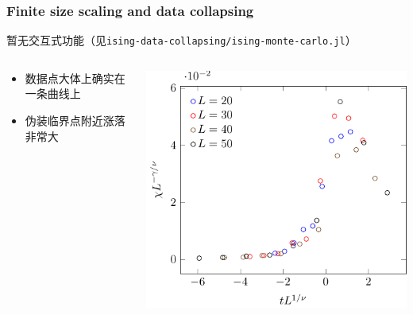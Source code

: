 \documentclass[UTF8]{ctexbeamer}
\begin{document}
\begin{frame}
\frametitle{Finite size scaling and data collapsing}

暂无交互式功能（见\texttt{ising-data-collapsing/ising-monte-carlo.jl}）

\begin{columns}

\begin{column}{0.5\textwidth}
    \begin{itemize}
        \item 数据点大体上确实在一条曲线上
        \item 伪装临界点附近涨落非常大
    \end{itemize}
\end{column}

\begin{column}{0.5\textwidth}
    \includegraphics[width=\textwidth]{../ising-data-collapsing/ising-data-collapsing-run-1.pdf}
\end{column}

\end{columns}

\end{frame}
\end{document}
